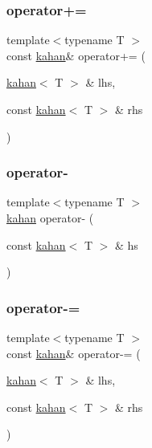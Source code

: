 \subsubsection{\texorpdfstring{operator+=}{operator+=}}
{\footnotesize\ttfamily template$<$typename T $>$ \\
const \mbox{\hyperlink{struct_space_h_1_1kahan}{kahan}}\& operator+= (\begin{DoxyParamCaption}\item[{\mbox{\hyperlink{struct_space_h_1_1kahan}{kahan}}$<$ T $>$ \&}]{lhs,  }\item[{const \mbox{\hyperlink{struct_space_h_1_1kahan}{kahan}}$<$ T $>$ \&}]{rhs }\end{DoxyParamCaption})\hspace{0.3cm}{\ttfamily [friend]}}

\mbox{\label{struct_space_h_1_1kahan_ab77d95a6c784d0d3aeb9c07c11cf4492}} 
\subsubsection{\texorpdfstring{operator-\/}{operator-}}
{\footnotesize\ttfamily template$<$typename T $>$ \\
\mbox{\hyperlink{struct_space_h_1_1kahan}{kahan}} operator-\/ (\begin{DoxyParamCaption}\item[{const \mbox{\hyperlink{struct_space_h_1_1kahan}{kahan}}$<$ T $>$ \&}]{hs }\end{DoxyParamCaption})\hspace{0.3cm}{\ttfamily [friend]}}

\mbox{\label{struct_space_h_1_1kahan_ac0214cfa7da4475dd8f209f071c26dd8}} 
\subsubsection{\texorpdfstring{operator-\/=}{operator-=}}
{\footnotesize\ttfamily template$<$typename T $>$ \\
const \mbox{\hyperlink{struct_space_h_1_1kahan}{kahan}}\& operator-\/= (\begin{DoxyParamCaption}\item[{\mbox{\hyperlink{struct_space_h_1_1kahan}{kahan}}$<$ T $>$ \&}]{lhs,  }\item[{const \mbox{\hyperlink{struct_space_h_1_1kahan}{kahan}}$<$ T $>$ \&}]{rhs }\end{DoxyParamCaption})\hspace{0.3cm}{\ttfamily [friend]}}


